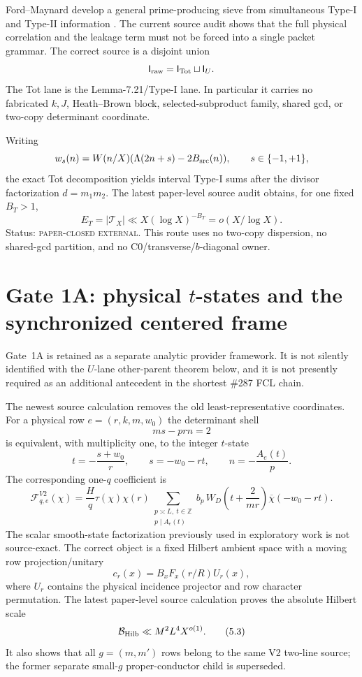 \documentclass[11pt]{article}
\theoremstyle{definition}
\newcommand{\1}{\mathbf 1}
\newcommand{\TX}{\mathcal T_X}
\newcommand{\paperclosed}{\textsc{paper-closed external}}
\begin{document}
Ford--Maynard develop a general prime-producing sieve from simultaneous Type-I and Type-II information \cite{FordMaynard2024}. The current source audit shows that the full physical correlation and the leakage term must not be forced into a single packet grammar. The correct source is a disjoint union
\[
\mathsf I_{\rm raw}=\mathsf I_{\rm Tot}\sqcup\mathsf I_U.
\]
The Tot lane is the Lemma-7.21/Type-I lane. In particular it carries no fabricated $k,J$, Heath--Brown block, selected-subproduct family, shared gcd, or two-copy determinant coordinate.

Writing
\[
w_s(n)=W(n/X)(\Lambda(2n+s)-2B_{\rm src}(n)),\qquad s\in\{-1,+1\},
\]
the exact Tot decomposition yields interval Type-I sums after the divisor factorization $d=m_1m_2$. The latest paper-level source audit obtains, for one fixed $B_T>1$,
\[
E_T=|\TX|\ll X(\log X)^{-B_T}=o(X/\log X).
\tag{4.1}
\]
Status: \paperclosed. This route uses no two-copy dispersion, no shared-gcd partition, and no C0/transverse/$b$-diagonal owner.

\section{Gate 1A: physical $t$-states and the synchronized centered frame}

Gate~1A is retained as a separate analytic provider framework. It is not silently identified with the $U$-lane other-parent theorem below, and it is not presently required as an additional antecedent in the shortest \#287 FCL chain.

The newest source calculation removes the old least-representative coordinates. For a physical row $e=(r,k,m,w_0)$ the determinant shell
\[
ms-prn=2
\]
is equivalent, with multiplicity one, to the integer $t$-state
\[
t=-\frac{s+w_0}{r},\qquad s=-w_0-rt,\qquad n=-\frac{A_e(t)}p.
\tag{5.1}
\]
The corresponding one-$q$ coefficient is
\[
\mathcal F^{V2}_{q,e}(\chi)=\frac Hq\tau(\chi)\chi(r)
\sum_{\substack{p\asymp L,\ t\in\mathbb Z\\p\mid A_e(t)}}
 b_p\,W_D\!\left(t+\frac{2}{mr}\right)\overline\chi(-w_0-rt).
\tag{5.2}
\]
The scalar smooth-state factorization previously used in exploratory work is not source-exact. The correct object is a fixed Hilbert ambient space with a moving row projection/unitary
\[
c_r(x)=B_xF_x(r/R)U_r(x),
\]
where $U_r$ contains the physical incidence projector and row character permutation. The latest paper-level source calculation proves the absolute Hilbert scale
\[
\mathcal B_{\rm Hilb}\ll M^2L^4X^{o(1)}.
\tag{5.3}
\]
It also shows that all $g=(m,m')$ rows belong to the same V2 two-line source; the former separate small-$g$ proper-conductor child is superseded.
\end{document}
